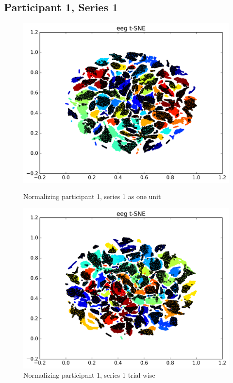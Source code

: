 \documentclass{article} %
\begin{document}
\subsection{Participant 1, Series 1}
\begin{figure}
	\centering
	\begin{minipage}{0.5\textwidth}
		\centering
		\includegraphics[width=1.0\textwidth]{P1S1u.png}
		\caption{Normalizing participant 1, series 1 as one unit}
		\label{fig:P1S1u}
	\end{minipage}\hfill
	\begin{minipage}{0.5\textwidth}
		\centering
		\includegraphics[width=1.0\textwidth]{P1S1t.png}
		\caption{Normalizing participant 1, series 1 trial-wise}
		\label{fig:P1S1t}
	\end{minipage}
\end{figure}
\end{document}
